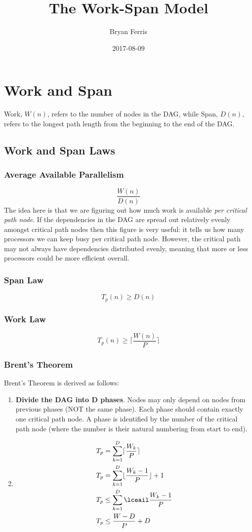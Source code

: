 \documentclass{article}
\title{The Work-Span Model}
\date{2017-08-09}
\author{Bryan Ferris}
\begin{document}
\ifstandalone
\maketitle
{}
\fi

\section{Work and Span}
Work, $W(n)$, refers to the number of nodes in the DAG, while Span, $D(n)$, refers to the longest path length from the beginning to the end of the DAG.

\subsection{Work and Span Laws}
\subsubsection{Average Available Parallelism}
\[\frac{W(n)}{D(n)}\]
The idea here is that we are figuring out how much work is available \textit{per critical path node}. If the dependencies in the DAG are spread out relatively evenly amongst critical path nodes then this figure is very useful: it tells us how many processors we can keep busy per critical path node. However, the critical path may not always have dependencies distributed evenly, meaning that more or less processors could be more efficient overall.

\subsubsection{Span Law}
\[T_p(n) \geq D(n)\]

\subsubsection{Work Law}
\[T_p(n) \geq \lceil \frac{W(n)}{P} \rceil\]

\subsubsection{Brent's Theorem}
Brent's Theorem is derived as follows:

\begin{enumerate}
	\item \textbf{Divide the DAG into D phases}. Nodes may only depend on nodes from previous phases (NOT the same phase). Each phase should contain exactly one critical path node. A phase is identified by the number of the critical path node (where the number is their natural numbering from start to end).
	\item \begin{align*}
		T_p &= \sum_{k=1}^D \lceil\frac{W_k}{P}\rceil\\
		T_p &= \sum_{k=1}^D \lfloor\frac{W_k - 1}{P}\rfloor + 1\\
		T_p &\leq \sum_{k=1}^D \lceail\frac{W_k - 1}{P}\\
		T_p &\leq \frac{W - D}{P} + D
  \end{align*}
\end{enumerate}
\end{document}
